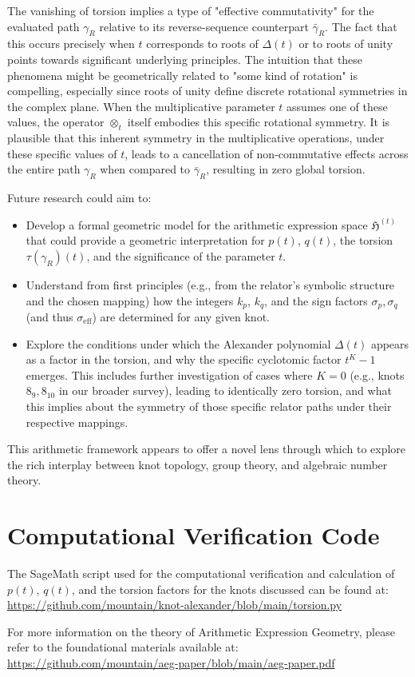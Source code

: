 \documentclass{article}[a4paper,12pt]
\begin{document}
The vanishing of torsion implies a type of "effective commutativity" for the evaluated path $\gamma_R$ relative to its reverse-sequence counterpart $\bar{\gamma}_R$. The fact that this occurs precisely when $t$ corresponds to roots of $\Delta(t)$ or to roots of unity points towards significant underlying principles. The intuition that these phenomena might be geometrically related to "some kind of rotation" is compelling, especially since roots of unity define discrete rotational symmetries in the complex plane. When the multiplicative parameter $t$ assumes one of these values, the operator $\otimes_t$ itself embodies this specific rotational symmetry. It is plausible that this inherent symmetry in the multiplicative operations, under these specific values of $t$, leads to a cancellation of non-commutative effects across the entire path $\gamma_R$ when compared to $\bar{\gamma}_R$, resulting in zero global torsion.

Future research could aim to:
\begin{itemize}
    \item Develop a formal geometric model for the arithmetic expression space $\mathfrak{H}^{(t)}$ that could provide a geometric interpretation for $p(t)$, $q(t)$, the torsion $\tau(\gamma_R)(t)$, and the significance of the parameter $t$.
    \item Understand from first principles (e.g., from the relator's symbolic structure and the chosen mapping) how the integers $k_p$, $k_q$, and the sign factors $\sigma_p, \sigma_q$ (and thus $\sigma_{\text{eff}}$) are determined for any given knot.
    \item Explore the conditions under which the Alexander polynomial $\Delta(t)$ appears as a factor in the torsion, and why the specific cyclotomic factor $t^K-1$ emerges. This includes further investigation of cases where $K=0$ (e.g., knots $8_9, 8_{10}$ in our broader survey), leading to identically zero torsion, and what this implies about the symmetry of those specific relator paths under their respective mappings.
\end{itemize}
This arithmetic framework appears to offer a novel lens through which to explore the rich interplay between knot topology, group theory, and algebraic number theory.

\section{Computational Verification Code}

The SageMath script used for the computational verification and calculation of $p(t)$, $q(t)$, and the torsion factors for the knots discussed can be found at:
\url{https://github.com/mountain/knot-alexander/blob/main/torsion.py}

For more information on the theory of Arithmetic Expression Geometry, please refer to the foundational materials available at:
\url{https://github.com/mountain/aeg-paper/blob/main/aeg-paper.pdf}
\end{document}
